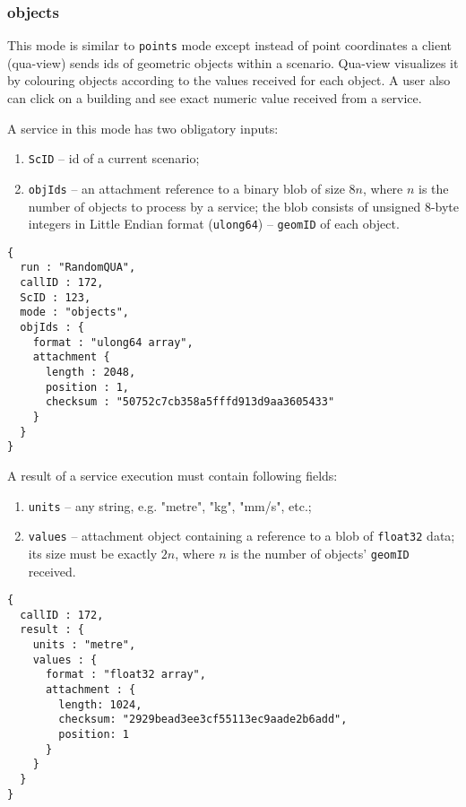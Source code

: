 \subsubsection{objects}

This mode is similar to \texttt{points} mode except instead of point coordinates a client (qua-view) sends ids of geometric objects
within a scenario.
Qua-view visualizes it by colouring objects according to the values received for each object.
A user also can click on a building and see exact numeric value received from a service.

A service in this mode has two obligatory inputs:
\begin{enumerate}
\item \texttt{ScID} -- id of a current scenario;
\item \texttt{objIds} -- an attachment reference to a binary blob of size $8n$, where $n$ is the number of objects to process by a service;
                         the blob consists of unsigned 8-byte integers in Little Endian format (\texttt{ulong64}) -- \texttt{geomID} of each object.
\end{enumerate}
\begin{lstlisting}[caption={A qua-compliant service run request for mode \texttt{objects}}, label={lst:quacompliantinput:objects}]
{
  run : "RandomQUA",
  callID : 172,
  ScID : 123,
  mode : "objects",
  objIds : {
    format : "ulong64 array",
    attachment {
      length : 2048,
      position : 1,
      checksum : "50752c7cb358a5fffd913d9aa3605433"
    }
  }
}
\end{lstlisting}

A result of a service execution must contain following fields:
\begin{enumerate}
\item \texttt{units} -- any string, e.g. "metre", "kg", "mm/s", etc.;
\item \texttt{values} -- attachment object containing a reference to a blob of \texttt{float32} data;
 its size must be exactly $2 n$, where $n$ is the number of objects' \texttt{geomID} received.
\end{enumerate}
\begin{lstlisting}[caption={A qua-compliant service output for mode \texttt{objects}}, label={lst:quacompliantresult:objects}]
{
  callID : 172,
  result : {
    units : "metre",
    values : {
      format : "float32 array",
      attachment : {
        length: 1024,
        checksum: "2929bead3ee3cf55113ec9aade2b6add",
        position: 1
      }
    }
  }
}
\end{lstlisting}

